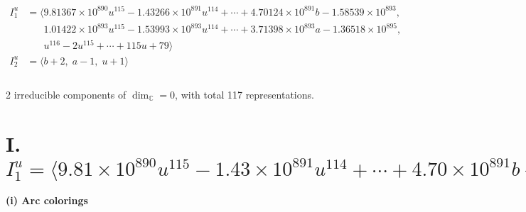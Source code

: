 \documentclass[1p]{elsarticle_modified}
\theoremstyle{definition}
\begin{document}
\begin{align*}
I^u_{1}&=\langle 
9.81367\times10^{890} u^{115}-1.43266\times10^{891} u^{114}+\cdots+4.70124\times10^{891} b-1.58539\times10^{893},\\
\phantom{I^u_{1}}&\phantom{= \langle  }1.01422\times10^{893} u^{115}-1.53993\times10^{893} u^{114}+\cdots+3.71398\times10^{893} a-1.36518\times10^{895},\\
\phantom{I^u_{1}}&\phantom{= \langle  }u^{116}-2 u^{115}+\cdots+115 u+79\rangle \\
I^u_{2}&=\langle 
b+2,\;a-1,\;u+1\rangle \\
\\
\end{align*}
\raggedright * 2 irreducible components of $\dim_{\mathbb{C}}=0$, with total 117 representations.\\
\newpage
\renewcommand{\arraystretch}{1}
\centering \section*{I. $I^u_{1}= \langle 9.81\times10^{890} u^{115}-1.43\times10^{891} u^{114}+\cdots+4.70\times10^{891} b-1.59\times10^{893},\;1.01\times10^{893} u^{115}-1.54\times10^{893} u^{114}+\cdots+3.71\times10^{893} a-1.37\times10^{895},\;u^{116}-2 u^{115}+\cdots+115 u+79 \rangle$}
\flushleft \textbf{(i) Arc colorings}\\
\end{document}
